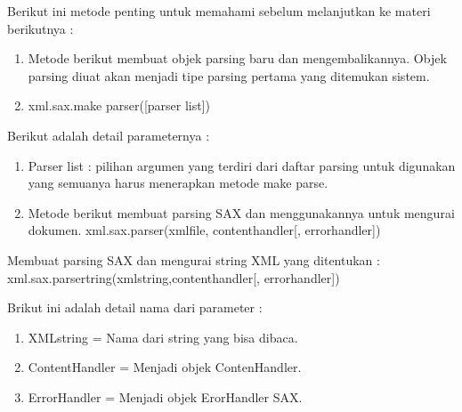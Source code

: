 Berikut ini metode penting untuk memahami sebelum melanjutkan ke materi berikutnya : 
\begin{enumerate}
  \item Metode berikut membuat objek parsing baru dan mengembalikannya. Objek parsing diuat akan menjadi tipe parsing pertama yang ditemukan sistem.
  \item xml.sax.make parser([parser list])
\end{enumerate}

Berikut adalah detail parameternya : 
\begin{enumerate}
  \item Parser list : pilihan argumen yang terdiri dari daftar parsing untuk digunakan yang semuanya harus menerapkan metode {make    parse}.
  \item Metode berikut membuat parsing SAX dan menggunakannya untuk mengurai dokumen. xml.sax.parser(xmlfile, contenthandler[, errorhandler])
\end{enumerate}

Membuat parsing SAX dan mengurai string XML yang ditentukan : 
xml.sax.parsertring(xmlstring,contenthandler[, errorhandler])

Brikut ini adalah detail nama dari parameter : 
\begin{enumerate}
  \item  {XMLstring}  = Nama dari string yang bisa dibaca.
  \item  {ContentHandler} = Menjadi objek ContenHandler.
  \item  {ErrorHandler} = Menjadi objek ErorHandler SAX. 
\end{enumerate}

